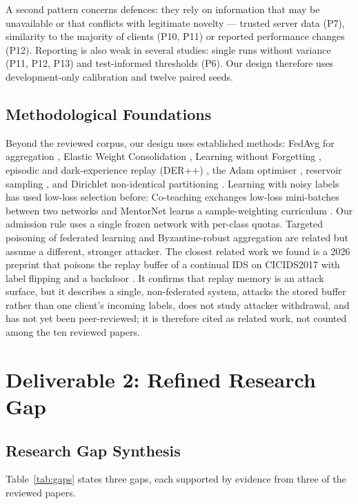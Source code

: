 \documentclass[10pt,a4paper]{article}
\begin{document}
A second pattern concerns defences: they rely on information that may be unavailable or that conflicts with legitimate novelty --- trusted server data (P7), similarity to the majority of clients (P10, P11) or reported performance changes (P12). Reporting is also weak in several studies: single runs without variance (P11, P12, P13) and test-informed thresholds (P6). Our design therefore uses development-only calibration and twelve paired seeds.

\subsection{Methodological Foundations}
Beyond the reviewed corpus, our design uses established methods: FedAvg for aggregation \cite{fedavg}, Elastic Weight Consolidation \cite{ewc}, Learning without Forgetting \cite{lwf}, episodic and dark-experience replay (DER++) \cite{tiny,der}, the Adam optimiser \cite{adam}, reservoir sampling \cite{vitter}, and Dirichlet non-identical partitioning \cite{hsu}. Learning with noisy labels has used low-loss selection before: Co-teaching exchanges low-loss mini-batches between two networks and MentorNet learns a sample-weighting curriculum \cite{coteach,mentornet}. Our admission rule uses a single frozen network with per-class quotas. Targeted poisoning of federated learning \cite{tolpegin} and Byzantine-robust aggregation \cite{krum,yin} are related but assume a different, stronger attacker. The closest related work we found is a 2026 preprint that poisons the replay buffer of a continual IDS on CICIDS2017 with label flipping and a backdoor \cite{replaypoison}. It confirms that replay memory is an attack surface, but it describes a single, non-federated system, attacks the stored buffer rather than one client's incoming labels, does not study attacker withdrawal, and has not yet been peer-reviewed; it is therefore cited as related work, not counted among the ten reviewed papers.

\section{Deliverable 2: Refined Research Gap}

\subsection{Research Gap Synthesis}
Table~\ref{tab:gaps} states three gaps, each supported by evidence from three of the reviewed papers.
\end{document}
